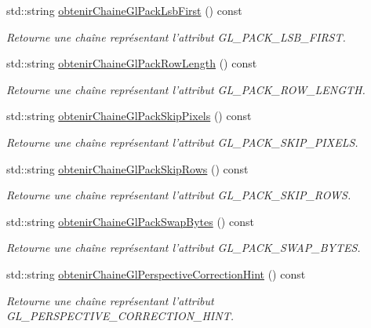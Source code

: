 \begin{DoxyCompactItemize}
std\-::string \hyperlink{group__utilitaire_ga49cc9b47a26f144e0651b4679752a02c}{obtenir\-Chaine\-Gl\-Pack\-Lsb\-First} () const 
\begin{DoxyCompactList}\small\item\em Retourne une chaîne représentant l'attribut G\-L\-\_\-\-P\-A\-C\-K\-\_\-\-L\-S\-B\-\_\-\-F\-I\-R\-S\-T. \end{DoxyCompactList}\item 
std\-::string \hyperlink{group__utilitaire_ga64b0337d0f84557f6f8661ec6e03e154}{obtenir\-Chaine\-Gl\-Pack\-Row\-Length} () const 
\begin{DoxyCompactList}\small\item\em Retourne une chaîne représentant l'attribut G\-L\-\_\-\-P\-A\-C\-K\-\_\-\-R\-O\-W\-\_\-\-L\-E\-N\-G\-T\-H. \end{DoxyCompactList}\item 
std\-::string \hyperlink{group__utilitaire_gadb44f6347d29047a0a3789c51f4913f6}{obtenir\-Chaine\-Gl\-Pack\-Skip\-Pixels} () const 
\begin{DoxyCompactList}\small\item\em Retourne une chaîne représentant l'attribut G\-L\-\_\-\-P\-A\-C\-K\-\_\-\-S\-K\-I\-P\-\_\-\-P\-I\-X\-E\-L\-S. \end{DoxyCompactList}\item 
std\-::string \hyperlink{group__utilitaire_ga13b70d48642c0b921c0497f1ed7e88fa}{obtenir\-Chaine\-Gl\-Pack\-Skip\-Rows} () const 
\begin{DoxyCompactList}\small\item\em Retourne une chaîne représentant l'attribut G\-L\-\_\-\-P\-A\-C\-K\-\_\-\-S\-K\-I\-P\-\_\-\-R\-O\-W\-S. \end{DoxyCompactList}\item 
std\-::string \hyperlink{group__utilitaire_ga34c8e9bce5b0b759995934900bc33e14}{obtenir\-Chaine\-Gl\-Pack\-Swap\-Bytes} () const 
\begin{DoxyCompactList}\small\item\em Retourne une chaîne représentant l'attribut G\-L\-\_\-\-P\-A\-C\-K\-\_\-\-S\-W\-A\-P\-\_\-\-B\-Y\-T\-E\-S. \end{DoxyCompactList}\item 
std\-::string \hyperlink{group__utilitaire_ga2f8a371d540a654c038ff2e3301a63d3}{obtenir\-Chaine\-Gl\-Perspective\-Correction\-Hint} () const 
\begin{DoxyCompactList}\small\item\em Retourne une chaîne représentant l'attribut G\-L\-\_\-\-P\-E\-R\-S\-P\-E\-C\-T\-I\-V\-E\-\_\-\-C\-O\-R\-R\-E\-C\-T\-I\-O\-N\-\_\-\-H\-I\-N\-T. \end{DoxyCompactList}\item 

\end{DoxyCompactItemize}
